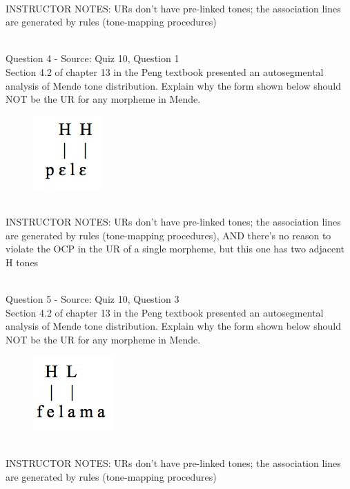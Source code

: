 \documentclass[12pt]{article}
\begin{document}
~\\
INSTRUCTOR NOTES: URs don't have pre-linked tones; the association lines are generated by rules (tone-mapping procedures)


~\\

{\large Question 4} - Source: Quiz 10, Question 1\\

Section 4.2 of chapter 13 in the Peng textbook presented an autosegmental analysis of Mende tone distribution. Explain why the form shown below should NOT be the UR for any morpheme in Mende.\\

\begin{figure}[H]
\includegraphics{../images/mende_house_e.png}
\end{figure}

~\\
INSTRUCTOR NOTES: URs don't have pre-linked tones; the association lines are generated by rules (tone-mapping procedures), AND there's no reason to violate the OCP in the UR of a single morpheme, but this one has two adjacent H tones


~\\

{\large Question 5} - Source: Quiz 10, Question 3\\

Section 4.2 of chapter 13 in the Peng textbook presented an autosegmental analysis of Mende tone distribution. Explain why the form shown below should NOT be the UR for any morpheme in Mende.\\

\begin{figure}[H]
\includegraphics{../images/mende_junction_a.png}
\end{figure}

~\\
INSTRUCTOR NOTES: URs don't have pre-linked tones; the association lines are generated by rules (tone-mapping procedures)
\end{document}
